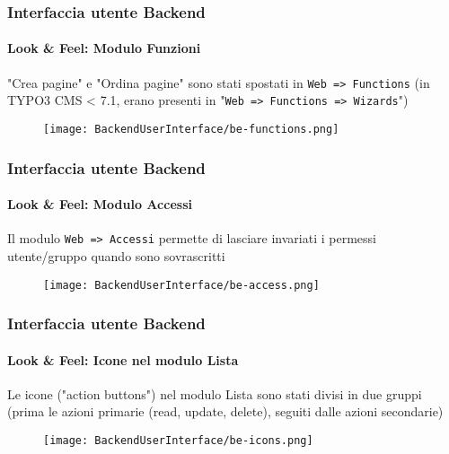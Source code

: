 \begin{frame}[fragile]
	\frametitle{Interfaccia utente Backend}
	\framesubtitle{Look \& Feel: Modulo Funzioni}

	"Crea pagine" e "Ordina pagine" sono stati spostati in \texttt{Web => Functions}\newline
	\smaller (in TYPO3 CMS < 7.1, erano presenti in "\texttt{Web => Functions => Wizards}")

	\begin{figure}
		\texttt{[image: BackendUserInterface/be-functions.png]}
	\end{figure}


\end{frame}


\begin{frame}[fragile]
	\frametitle{Interfaccia utente Backend}
	\framesubtitle{Look \& Feel: Modulo Accessi}

	Il modulo \texttt{Web => Accessi} permette di lasciare invariati\newline
	i permessi utente/gruppo quando sono sovrascritti

	\begin{figure}
		\texttt{[image: BackendUserInterface/be-access.png]}
	\end{figure}

\end{frame}


\begin{frame}[fragile]
	\frametitle{Interfaccia utente Backend}
	\framesubtitle{Look \& Feel: Icone nel modulo Lista}

	Le icone ("action buttons") nel modulo Lista sono stati divisi in due gruppi\newline
	\smaller (prima le azioni primarie (read, update, delete), seguiti dalle azioni secondarie)

	\begin{figure}
		\texttt{[image: BackendUserInterface/be-icons.png]}
	\end{figure}

\end{frame}

